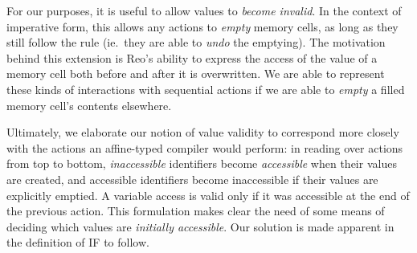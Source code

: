 For our purposes, it is useful to allow values to \textit{become invalid}. In the context of imperative form, this allows any actions to \textit{empty} memory cells, as long as they still follow the rule (ie.\ they are able to \textit{undo} the emptying). The motivation behind this extension is Reo's ability to express the access of the value of a memory cell both before and after it is overwritten. We are able to represent these kinds of interactions with sequential actions if we are able to \textit{empty} a filled memory cell's contents elsewhere. 

Ultimately, we elaborate our notion of value validity to correspond more closely with the actions an affine-typed compiler would perform: in reading over actions from top to bottom, \textit{inaccessible} identifiers become \textit{accessible} when their values are created, and accessible identifiers become inaccessible if their values are explicitly emptied. A variable access is valid only if it was accessible at the end of the previous action. This formulation makes clear the need of some means of deciding which values are \textit{initially accessible}. Our solution is made apparent in the definition of IF to follow.

%

